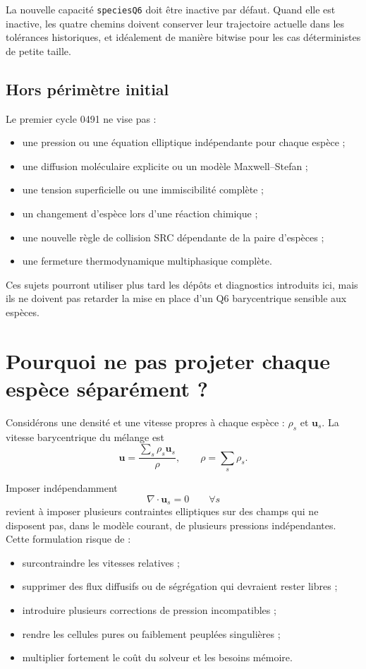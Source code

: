 \documentclass[11pt,a4paper]{article}
\newcommand{\code}[1]{\texttt{#1}}
\newcommand{\vect}[1]{\bm{#1}}
\begin{document}
La nouvelle capacité \code{speciesQ6} doit être inactive par défaut. Quand elle est inactive, les quatre chemins doivent conserver leur trajectoire actuelle dans les tolérances historiques, et idéalement de manière bitwise pour les cas déterministes de petite taille.

\subsection{Hors périmètre initial}

Le premier cycle 0491 ne vise pas :
\begin{itemize}
  \item une pression ou une équation elliptique indépendante pour chaque espèce ;
  \item une diffusion moléculaire explicite ou un modèle Maxwell--Stefan ;
  \item une tension superficielle ou une immiscibilité complète ;
  \item un changement d'espèce lors d'une réaction chimique ;
  \item une nouvelle règle de collision SRC dépendante de la paire d'espèces ;
  \item une fermeture thermodynamique multiphasique complète.
\end{itemize}

Ces sujets pourront utiliser plus tard les dépôts et diagnostics introduits ici, mais ils ne doivent pas retarder la mise en place d'un Q6 barycentrique sensible aux espèces.

\section{Pourquoi ne pas projeter chaque espèce séparément ?}

Considérons une densité et une vitesse propres à chaque espèce : \(\rho_s\) et \(\vect{u}_s\). La vitesse barycentrique du mélange est
\begin{equation}
  \vect{u}=\frac{\sum_s \rho_s\vect{u}_s}{\rho},
  \qquad \rho=\sum_s\rho_s.
\end{equation}

Imposer indépendamment
\begin{equation}
  \nabla\cdot\vect{u}_s=0 \qquad \forall s
\end{equation}
revient à imposer plusieurs contraintes elliptiques sur des champs qui ne disposent pas, dans le modèle courant, de plusieurs pressions indépendantes. Cette formulation risque de :
\begin{itemize}
  \item surcontraindre les vitesses relatives ;
  \item supprimer des flux diffusifs ou de ségrégation qui devraient rester libres ;
  \item introduire plusieurs corrections de pression incompatibles ;
  \item rendre les cellules pures ou faiblement peuplées singulières ;
  \item multiplier fortement le coût du solveur et les besoins mémoire.
\end{itemize}
\end{document}
